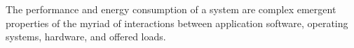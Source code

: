 



The performance and energy consumption of a system are complex emergent properties of the myriad of interactions between application software, operating systems, hardware, and offered loads. 

